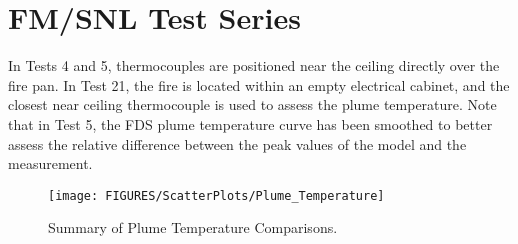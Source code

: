 \section{FM/SNL Test Series}

In Tests 4 and 5, thermocouples are positioned near the ceiling directly over the fire pan.
In Test 21, the fire is located within an empty electrical cabinet, and the closest near ceiling thermocouple
is used to assess the plume temperature.  Note that in Test 5, the FDS plume temperature curve has been smoothed
to better assess the relative difference between the peak values of the model and the measurement.


\begin{figure}[ht]
\texttt{[image: FIGURES/ScatterPlots/Plume\_Temperature]}
\caption{Summary of Plume Temperature Comparisons.}
\label{VTT_FM_SNL_Plume}
\end{figure}

\clearpage

